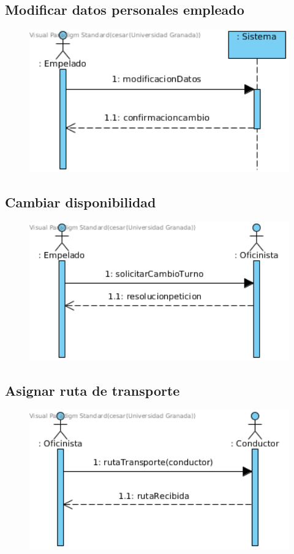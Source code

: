 \subsection{Modificar datos personales empleado}
\begin{figure}[H]
	\centering
	\includegraphics[width=16cm]{3}
\end{figure}
\subsection{Cambiar disponibilidad}
\begin{figure}[H]
	\centering
	\includegraphics[width=16cm]{4}
\end{figure}
\subsection{Asignar ruta de transporte}
\begin{figure}[H]
	\centering
	\includegraphics[width=16cm]{5}
\end{figure}
